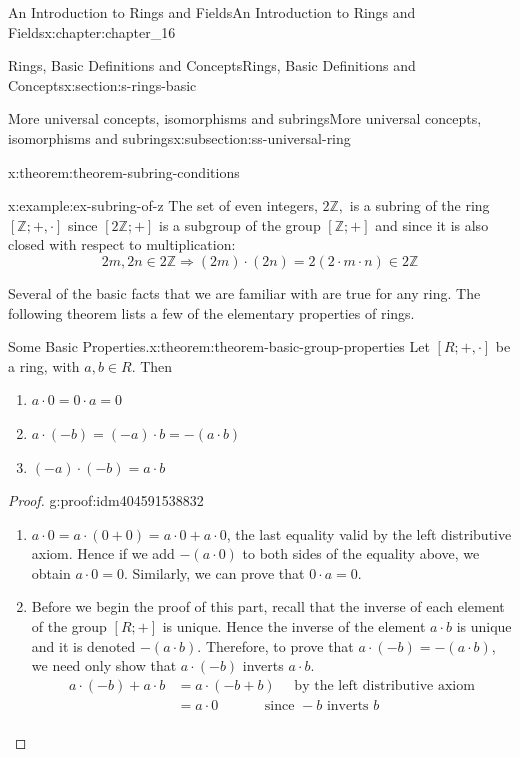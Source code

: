 \documentclass[twoside,10pt,]{book}
\numberwithin{equation}{section}
\begin{document}
\begin{chapterptx}{An Introduction to Rings and Fields}{}{An Introduction to Rings and Fields}{}{}{x:chapter:chapter_16}
\begin{sectionptx}{Rings, Basic Definitions and Concepts}{}{Rings, Basic Definitions and Concepts}{}{}{x:section:s-rings-basic}
\begin{subsectionptx}{More universal concepts, isomorphisms and subrings}{}{More universal concepts, isomorphisms and subrings}{}{}{x:subsection:ss-universal-ring}
\begin{theorem}{}{}{x:theorem:theorem-subring-conditions}
\begin{enumerate}[label=(\arabic*)]
\end{enumerate}
%
\end{theorem}
\begin{example}{}{x:example:ex-subring-of-z}%
The set of even integers, \(2\mathbb{Z},\) is a subring of the ring \([\mathbb{Z}; +, \cdot ]\) since \([2\mathbb{Z}; +]\) is a subgroup of the group \([\mathbb{Z}; +]\) and since it is also closed with respect to multiplication:%
\begin{equation*}
2m, 2n \in  2\mathbb{Z} \Rightarrow (2m)\cdot (2n)=2(2\cdot m\cdot n)\in 2\mathbb{Z}
\end{equation*}
%
\end{example}
Several of the basic facts that we are familiar with are true for any ring. The following theorem lists a few of the elementary properties of rings.%
\begin{theorem}{Some Basic Properties.}{}{x:theorem:theorem-basic-group-properties}%
Let \([R; +, \cdot]\) be a ring, with \(a, b \in  R\).   Then%
\begin{enumerate}[label=(\arabic*)]
\item{}\(a \cdot  0 = 0 \cdot  a = 0\)%
\item{}\(a\cdot (-b) = (-a) \cdot b = -(a\cdot b)\)%
\item{}\((-a) \cdot  (-b) = a\cdot b\)%
\end{enumerate}
%
\end{theorem}
\begin{proof}{}{g:proof:idm404591538832}
%
\begin{enumerate}[label=(\arabic*)]
\item{}\(a \cdot  0 = a \cdot(0 + 0) = a \cdot  0 + a \cdot  0\), the last equality valid by the left distributive axiom. Hence if we add \(-(a \cdot  0)\) to both sides of the equality  above, we obtain \(a \cdot  0 = 0\). Similarly, we can prove that  \(0 \cdot  a = 0\).%
\item{}Before we begin the proof of this part, recall that the inverse of each element of the group \([R; +]\) is unique. Hence the inverse of the element \(a \cdot  b\) is unique and it is denoted  \(-(a \cdot  b)\). Therefore, to prove that \(a\cdot (-b) = -(a \cdot  b)\), we need only show that \(a\cdot (-b)\) inverts \(a\cdot b\).%
\begin{equation*}
\begin{split}
a\cdot (-b)+a\cdot b &= a\cdot (-b+b)\quad \textrm{      by the left distributive axiom}\\
&= a\cdot  0\quad \quad\quad \textrm{   since } -b \textrm{ inverts } b\\

\end{split}
\end{equation*}
\end{enumerate}
\end{proof}
\end{subsectionptx}
\end{sectionptx}
\end{chapterptx}
\end{document}

